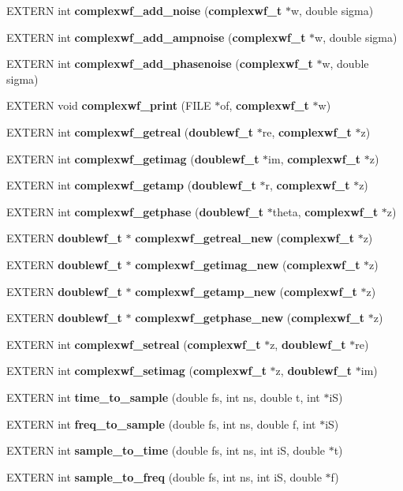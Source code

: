 \begin{CompactItemize}
\item 
EXTERN int {\bf complexwf\_\-add\_\-noise} ({\bf complexwf\_\-t} $\ast$w, double sigma)
\item 
EXTERN int {\bf complexwf\_\-add\_\-ampnoise} ({\bf complexwf\_\-t} $\ast$w, double sigma)
\item 
EXTERN int {\bf complexwf\_\-add\_\-phasenoise} ({\bf complexwf\_\-t} $\ast$w, double sigma)
\item 
EXTERN void {\bf complexwf\_\-print} (FILE $\ast$of, {\bf complexwf\_\-t} $\ast$w)
\item 
EXTERN int {\bf complexwf\_\-getreal} ({\bf doublewf\_\-t} $\ast$re, {\bf complexwf\_\-t} $\ast$z)
\item 
EXTERN int {\bf complexwf\_\-getimag} ({\bf doublewf\_\-t} $\ast$im, {\bf complexwf\_\-t} $\ast$z)
\item 
EXTERN int {\bf complexwf\_\-getamp} ({\bf doublewf\_\-t} $\ast$r, {\bf complexwf\_\-t} $\ast$z)
\item 
EXTERN int {\bf complexwf\_\-getphase} ({\bf doublewf\_\-t} $\ast$theta, {\bf complexwf\_\-t} $\ast$z)
\item 
EXTERN {\bf doublewf\_\-t} $\ast$ {\bf complexwf\_\-getreal\_\-new} ({\bf complexwf\_\-t} $\ast$z)
\item 
EXTERN {\bf doublewf\_\-t} $\ast$ {\bf complexwf\_\-getimag\_\-new} ({\bf complexwf\_\-t} $\ast$z)
\item 
EXTERN {\bf doublewf\_\-t} $\ast$ {\bf complexwf\_\-getamp\_\-new} ({\bf complexwf\_\-t} $\ast$z)
\item 
EXTERN {\bf doublewf\_\-t} $\ast$ {\bf complexwf\_\-getphase\_\-new} ({\bf complexwf\_\-t} $\ast$z)
\item 
EXTERN int {\bf complexwf\_\-setreal} ({\bf complexwf\_\-t} $\ast$z, {\bf doublewf\_\-t} $\ast$re)
\item 
EXTERN int {\bf complexwf\_\-setimag} ({\bf complexwf\_\-t} $\ast$z, {\bf doublewf\_\-t} $\ast$im)
\item 
EXTERN int \textbf{time\_\-to\_\-sample} (double fs, int ns, double t, int $\ast$iS)\label{group__wave_g97c0e95c3559f400c84603c768307544}

\item 
EXTERN int \textbf{freq\_\-to\_\-sample} (double fs, int ns, double f, int $\ast$iS)\label{group__wave_g6f575cd6ad7e547c4d55f530a003337a}

\item 
EXTERN int \textbf{sample\_\-to\_\-time} (double fs, int ns, int iS, double $\ast$t)\label{group__wave_gc330e9905065c7209c22251d86a20ef7}

\item 
EXTERN int \textbf{sample\_\-to\_\-freq} (double fs, int ns, int iS, double $\ast$f)\label{group__wave_g6ce85ffae7051ec62a1f19ad23cbd6d5}

\end{CompactItemize}
